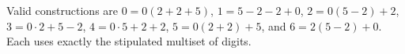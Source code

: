 Valid constructions are $0=0(2+2+5)$, $1=5-2-2+0$, $2=0(5-2)+2$, $3=0\cdot2+5-2$, $4=0\cdot5+2+2$, $5=0(2+2)+5$, and $6=2(5-2)+0$. Each uses exactly the stipulated multiset of digits.
